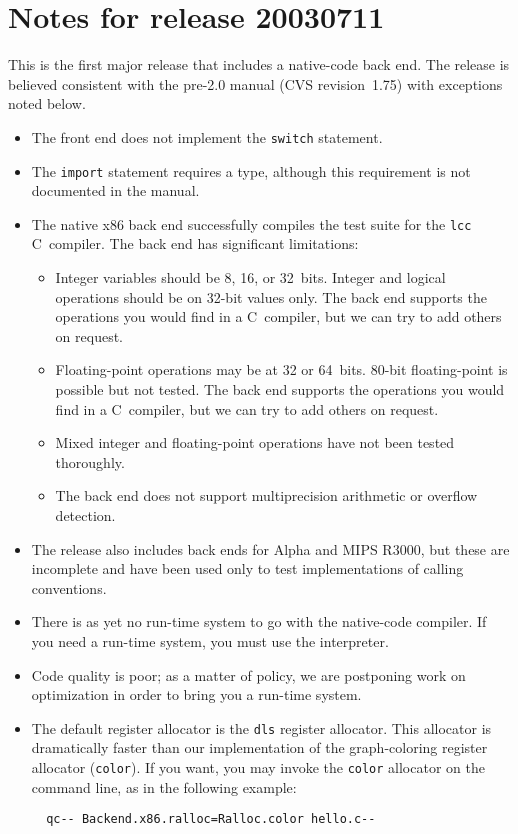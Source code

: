 \documentclass{article}
\begin{document}
\section{Notes for release 20030711}


This is the first major release that includes a native-code back end.
The release is believed consistent with the pre-2.0 manual (CVS
revision~1.75) with exceptions noted below.
\begin{itemize}
\item
The front end does not implement the \texttt{switch} statement.
\item
The \texttt{import} statement requires a type, although this
requirement is not documented in the manual.
\item
The native x86 back end successfully compiles the test suite
for the \texttt{lcc} C~compiler.
The back end has significant limitations:
\begin{itemize}
\item
Integer variables should be 8, 16, or 32~bits.
Integer and logical operations should be on 32-bit values only.
The back end supports the operations you would find in a C~compiler,
but we can try to add others on request.
\item
Floating-point operations may be at 32 or 64~bits.
80-bit floating-point is possible but not tested.
The back end supports the operations you would find in a C~compiler,
but we can try to add others on request.
\item 
Mixed integer and floating-point operations have not been tested
thoroughly. 
\item
The back end does not support multiprecision arithmetic or overflow
detection. 
\end{itemize}
\item
The release also includes back ends for Alpha and MIPS R3000, but these are
incomplete and have been used only to test implementations of calling
conventions. 
\item
There is as yet no run-time system to go with the native-code
compiler.
If you need a run-time system, you must use the interpreter.
\item
 Code quality is poor; as a matter of policy, we are postponing
       work on optimization in order to bring you a run-time system.
\item
The default register allocator is the \texttt{dls} register allocator.
This allocator is dramatically faster than our implementation of the
graph-coloring register allocator (\texttt{color}).
If you want, you may invoke the \texttt{color} allocator on the
command line, as in the following example:
\begin{verbatim} 
  qc-- Backend.x86.ralloc=Ralloc.color hello.c--
\end{verbatim}
\end{itemize}
\end{document}
